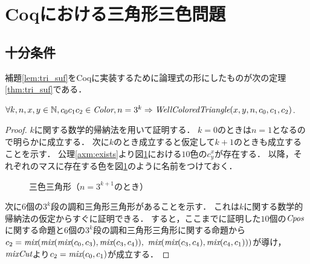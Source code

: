 \section{Coqにおける三角形三色問題}

\subsection{十分条件}
補題\ref{lem:tri_suf}をCoqに実装するために論理式の形にしたものが次の定理\ref{thm:tri_suf}である．
\begin{thm}[十分条件] \label{thm:tri_suf}
  $\forall k, n, x, y \in \mathbb{N}, c_0 c_1 c_2 \in \textit{Color}, n = 3 ^ k \Rightarrow \textit{WellColoredTriangle}(x,y,n,c_0,c_1,c_2)$.
\end{thm}
\begin{proof}
  $k$に関する数学的帰納法を用いて証明する．
  $k=0$のときは$n=1$となるので明らかに成立する．
  次に$k$のとき成立すると仮定して$k+1$のときも成立することを示す．
  公理\ref{axm:exists}より図\ref{fig:suf_steps}における$10$色の$c^x_y$が存在する．
  以降，それぞれのマスに存在する色を図\ref{fig:suf_steps}のように名前をつけておく．
  \begin{figure}[h]
    \centering
    
    \caption{三色三角形（$n=3^{k+1}$のとき）}
    \label{fig:suf_steps}
  \end{figure} 
  次に$6$個の$3^k$段の調和三角形三角形があることを示す．
  これは$k$に関する数学的帰納法の仮定からすぐに証明できる．
  すると，ここまでに証明した$10$個の$\textit{Cpos}$に関する命題と$6$個の$3^k$段の調和三角形三角形に関する命題から$c_2 = \textit{mix}(\textit{mix}(\textit{mix}(c_0,c_3),\textit{mix}(c_3,c_4)),$ $\textit{mix}(\textit{mix}(c_3,c_4),\textit{mix}(c_4,c_1)))$が導け，$\textit{mixCut}$より$c_2=\textit{mix}(c_0,c_1)$が成立する．
\end{proof}


